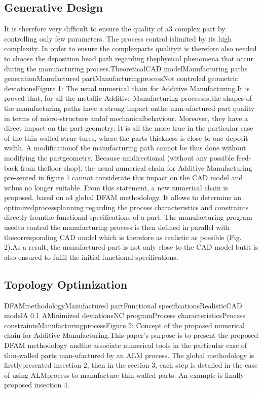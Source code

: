 \documentclass[conference]{IEEEtran}
\begin{document}
\subsection{Generative Design}
It is therefore very difficult to ensure the quality of a3
complex part by controlling only few parameters.  The process control islimited by its high complexity. In order to ensure the complexparts qualityit is therefore also needed to choose the deposition head path regarding thephysical phenomena that occur during the manufacturing process.TheoreticalCAD modelManufacturing paths generationManufactured partManufacturingprocessNot controled geometric deviationsFigure 1: The usual numerical chain for Additive Manufacturing.It is proved that, for all the metallic Additive Manufacturing processes,the shapes of the manufacturing paths have a strong impact onthe man-ufactured part quality in terms of micro-structure andof mechanicalbehaviour. Moreover, they have a direct impact on the part geometry. It is all the more true in the particular case of the thin-walled struc-tures, where the parts thickness is close to one deposit width. A modificationof the manufacturing path cannot be thus done without modifying the partgeometry. Because unidirectional (without any possible feed-back from thefloor-shop), the usual numerical chain for Additive Manufacturing pre-sented in figure 1 cannot considerate this impact on the CAD model and isthus no longer suitable .From this statement, a new numerical chain is proposed, based on a4
global DFAM methodology.  It allows to determine an optimizedprocessplanning regarding the process characteristics and constraints directly fromthe functional specifications of a part.  The manufacturing program usedto control the manufacturing process is then defined in parallel with thecorresponding CAD model which is therefore as realistic as possible (Fig. 2).As a result, the manufactured part is not only close to the CAD model butit is also ensured to fulfil the initial functional specifications.
\subsection{Topology Optimization}
DFAMmethodologyManufactured partFunctional specificationsRealisticCAD modelA  0.1 AMinimized deviationsNC programProcess characteristicsProcess constraintsManufacturingprocessFigure 2: Concept of the proposed numerical chain for Additive Manufacturing.This paper’s purpose is to present the proposed DFAM methodology andthe associate numerical tools in the particular case of thin-walled parts man-ufactured by an ALM process. The global methodology is firstlypresented insection 2, then in the section 3, each step is detailed in the case of using ALMprocess to manufacture thin-walled parts. An example is finally proposed insection 4.
\end{document}
